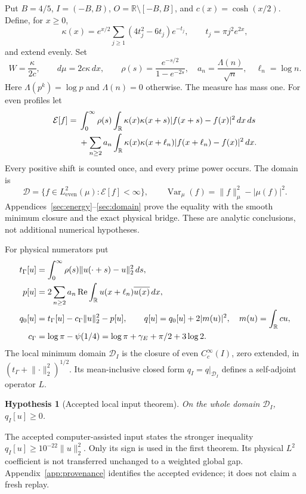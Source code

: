 \documentclass[11pt,a4paper]{article}
\numberwithin{equation}{section}
\newtheorem{hypothesis}[theorem]{Hypothesis}
\theoremstyle{remark}\newtheorem{remark}[theorem]{Remark}
\newcommand{\R}{\mathbb R}\newcommand{\C}{\mathbb C}
\newcommand{\E}{\mathcal E}\newcommand{\D}{\mathcal D}
\newcommand{\He}{L^2_{\mathrm{even}}(\mu)}\newcommand{\Le}{L^2_{\mathrm{even}}(dx)}
\newcommand{\tg}{t_\Gamma}\newcommand{\cg}{c_\Gamma}
\newcommand{\norm}[1]{\lVert#1\rVert}\newcommand{\abs}[1]{\lvert#1\rvert}
\newcommand{\Var}{\operatorname{Var}}\newcommand{\supp}{\operatorname{supp}}
\begin{document}
Put $B=4/5$, $I=(-B,B)$, $O=\R\setminus[-B,B]$, and $c(x)=\cosh(x/2)$. Define, for $x\ge0$,
\begin{equation}\label{eq:mainkappa}
 \kappa(x)=e^{x/2}\sum_{j\ge1}(4t_j^2-6t_j)e^{-t_j},
 \qquad t_j=\pi j^2e^{2x},
\end{equation}
and extend evenly. Set
\begin{equation}\label{eq:weights}
 W=\frac{\kappa}{2c},\qquad d\mu=2c\kappa\,dx,\qquad
 \rho(s)=\frac{e^{-s/2}}{1-e^{-2s}},\quad
 a_n=\frac{\Lambda(n)}{\sqrt n},\quad \ell_n=\log n.
\end{equation}
Here $\Lambda(p^k)=\log p$ and $\Lambda(n)=0$ otherwise. The measure has mass one. For even profiles let
\begin{align}
 \E[f]={}&\int_0^\infty\rho(s)\int_\R\kappa(x)\kappa(x+s)
 |f(x+s)-f(x)|^2\,dx\,ds\notag\\
 &+\sum_{n\ge2}a_n\int_\R\kappa(x)\kappa(x+\ell_n)
 |f(x+\ell_n)-f(x)|^2\,dx.\label{eq:mainenergy}
\end{align}
Every positive shift is counted once, and every prime power occurs. The domain is
\[
 \D=\{f\in\He:\E[f]<\infty\},\qquad
 \Var_\mu(f)=\norm f_\mu^2-|\mu(f)|^2.
\]
Appendices~\ref{sec:energy}--\ref{sec:domain} prove the equality with the smooth minimum closure and the exact physical bridge. These are analytic conclusions, not additional numerical hypotheses.

For physical numerators put
\begin{align}
 \tg[u]&=\int_0^\infty\rho(s)\norm{u(\cdot+s)-u}_2^2\,ds,
 \label{eq:physicalgamma}\\
 p[u]&=2\sum_{n\ge2}a_n\operatorname{Re}\int_\R
 u(x+\ell_n)\overline{u(x)}\,dx,\label{eq:physicalprime}\\
 q_0[u]&=\tg[u]-\cg\norm u_2^2-p[u],\qquad
 q[u]=q_0[u]+2|m(u)|^2,\quad m(u)=\int_\R cu,\label{eq:qzero}\\
 \cg&=\log\pi-\psi(1/4)=\log\pi+\gamma_E+\pi/2+3\log2.\notag
\end{align}
The local minimum domain $\D_I$ is the closure of even $C_c^\infty(I)$, zero extended, in $(\tg+\norm{\cdot}_2^2)^{1/2}$. Its mean-inclusive closed form $q_I=q|_{\D_I}$ defines a self-adjoint operator $L$.

\begin{hypothesis}[Accepted local input theorem]\label{hyp:local}
On the whole domain $\D_I$, $q_I[u]\ge0$.
\end{hypothesis}
The accepted computer-assisted input states the stronger inequality $q_I[u]\ge10^{-22}\norm u_2^2$. Only its sign is used in the first theorem. Its physical $L^2$ coefficient is not transferred unchanged to a weighted global gap. Appendix~\ref{app:provenance} identifies the accepted evidence; it does not claim a fresh replay.
\end{document}
